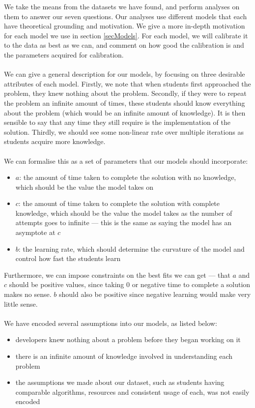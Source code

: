 We take the means from the datasets we have found, and perform analyses on them
to answer our seven questions.
Our analyses use different models that each have theoretical grounding and
motivation.
We give a more in-depth motivation for each model we use in section
\ref{secModels}.
For each model, we will calibrate it to the data as best as we can, and comment
on how good the calibration is and the parameters acquired for calibration.\\
\\
We can give a general description for our models, by focusing on
three desirable attributes of each model.
Firstly, we note that when students first approached the problem, they knew
nothing about the problem.
Secondly, if they were to repeat the problem an infinite amount of times, these students
should know everything about the problem (which would be an infinite amount of
knowledge).
It is then sensible to say that any time they still require is the
implementation of the solution.
Thirdly, we should see some non-linear rate over multiple iterations as students acquire
more knowledge.\\
\\
We can formalise this as a set of parameters that our models should incorporate:
\begin{itemize}
  \item $a$: the amount of time taken to complete the solution with no knowledge,
  which should be the value the model takes on \AZ
  \item $c$: the amount of time taken to complete the solution with complete
  knowledge, which should be the value the model takes as the number of attempts
  goes to infinite --- this is the same as saying the model has an asymptote at $c$
  \item $b$: the learning rate, which should determine the curvature of the
  model and control how fast the students learn
\end{itemize}

Furthermore, we can impose constraints on the best fits we can get --- that $a$
and $c$ should be positive values, since taking 0 or negative time to complete a
solution makes no sense.
$b$ should also be positive since negative learning would make very little
sense.\\
\\
We have encoded several assumptions into our models, as listed below:
\begin{itemize}
  \item developers knew nothing about a problem before they began working on it
  \item there is an infinite amount of knowledge involved in understanding each
  problem
  \item the assumptions we made about our dataset, such as students having
  comparable algorithms, resources and consistent usage of each, was not easily
  encoded
\end{itemize}

